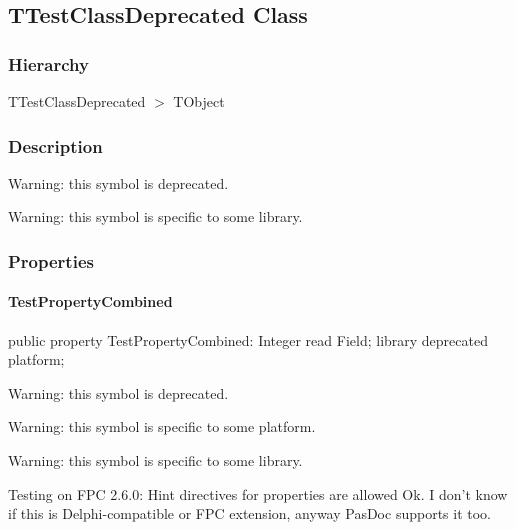 \documentclass{report}
\begin{document}
\subsection*{TTestClassDeprecated Class}
\subsubsection*{\large{\textbf{Hierarchy}}\normalsize\hspace{1ex}\hfill}
TTestClassDeprecated {$>$} TObject
\subsubsection*{\large{\textbf{Description}}\normalsize\hspace{1ex}\hfill}
Warning: this symbol is deprecated.

Warning: this symbol is specific to some library.

\subsubsection*{\large{\textbf{Properties}}\normalsize\hspace{1ex}\hfill}
\paragraph*{TestPropertyCombined}\hspace*{\fill}

\begin{list}{}{
\setlength{\itemindent}{0cm}
\setlength{\listparindent}{0cm}
\setlength{\leftmargin}{\evensidemargin}
\addtolength{\leftmargin}{\tmplength}
\settowidth{\labelsep}{X}
\addtolength{\leftmargin}{\labelsep}
\setlength{\labelwidth}{\tmplength}
}
\begin{flushleft}
\item[\textbf{Declaration}\hfill]
\begin{ttfamily}
public property TestPropertyCombined: Integer read Field; library deprecated platform;\end{ttfamily}


\end{flushleft}
\par
\item[\textbf{Description}]
Warning: this symbol is deprecated.

Warning: this symbol is specific to some platform.

Warning: this symbol is specific to some library.

Testing on FPC 2.6.0: Hint directives for properties are allowed Ok. I don't know if this is Delphi{-}compatible or FPC extension, anyway PasDoc supports it too.

\end{list}
\end{document}
